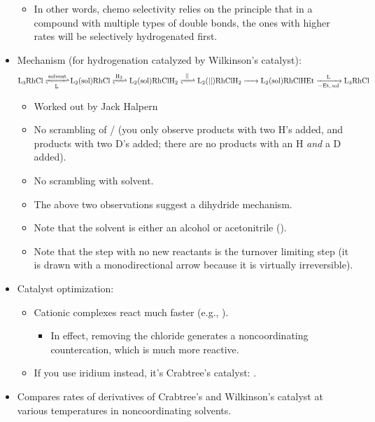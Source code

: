 \documentclass[../notes.tex]{subfiles}
\begin{document}
\begin{itemize}
    \begin{itemize}
        \item In other words, chemo selectivity relies on the principle that in a compound with multiple types of double bonds, the ones with higher rates will be selectively hydrogenated first.
    \end{itemize}
    \item Mechanism (for hydrogenation catalyzed by Wilkinson's catalyst):
    \begin{equation*}
        \ce{L3RhCl <=>[{solvent}][L] L2({sol})RhCl <=>[H2] L2({sol})RhClH2 <=>[||] L2(||)RhClH2 -> L2({sol})RhClHEt ->[L][-Et, {sol}] L3RhCl}
    \end{equation*}
    \begin{itemize}
        \item Worked out by Jack Halpern
        \item No scrambling of / (you only observe products with two H's added, and products with two D's added; there are no products with an H \emph{and} a D added).
        \item No scrambling with solvent.
        \item The above two observations suggest a dihydride mechanism.
        \item Note that the solvent is either an alcohol or acetonitrile ().
        \item Note that the step with no new reactants is the turnover limiting step (it is drawn with a monodirectional arrow because it is virtually irreversible).
    \end{itemize}
    \item Catalyst optimization:
    \begin{itemize}
        \item Cationic  complexes react much faster (e.g., ).
        \begin{itemize}
            \item In effect, removing the chloride generates a noncoordinating countercation, which is much more reactive.
        \end{itemize}
        \item If you use iridium instead, it's Crabtree's catalyst: .
    \end{itemize}
    \item Compares rates of derivatives of Crabtree's and Wilkinson's catalyst at various temperatures in noncoordinating solvents.

\end{itemize}
\end{document}
